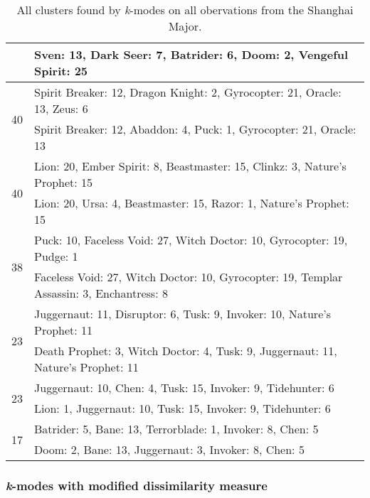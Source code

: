 \documentclass[result.tex]{subfiles}
\begin{document}
\begin{table}[H]
\begin{tabular}{ | c | p{12.5cm} | }
    & Sven: 13, Dark Seer: 7, Batrider: 6, Doom: 2, Vengeful Spirit: 25 \\
    \hline
    \multirow{2}{*}{40}
    & Spirit Breaker: 12, Dragon Knight: 2, Gyrocopter: 21, Oracle: 13, Zeus: 6 \\
    & Spirit Breaker: 12, Abaddon: 4, Puck: 1, Gyrocopter: 21, Oracle: 13 \\
    \hline
    \multirow{2}{*}{40}
    & Lion: 20, Ember Spirit: 8, Beastmaster: 15, Clinkz: 3, Nature's Prophet: 15 \\
    & Lion: 20, Ursa: 4, Beastmaster: 15, Razor: 1, Nature's Prophet: 15 \\
    \hline
    \multirow{2}{*}{38}
    & Puck: 10, Faceless Void: 27, Witch Doctor: 10, Gyrocopter: 19, Pudge: 1 \\
    & Faceless Void: 27, Witch Doctor: 10, Gyrocopter: 19, Templar Assassin: 3, Enchantress: 8 \\
    \hline
    \multirow{2}{*}{23}
    & Juggernaut: 11, Disruptor: 6, Tusk: 9, Invoker: 10, Nature's Prophet: 11 \\
    & Death Prophet: 3, Witch Doctor: 4, Tusk: 9, Juggernaut: 11, Nature's Prophet: 11 \\
    \hline
    \multirow{2}{*}{23}
    & Juggernaut: 10, Chen: 4, Tusk: 15, Invoker: 9, Tidehunter: 6 \\
    & Lion: 1, Juggernaut: 10, Tusk: 15, Invoker: 9, Tidehunter: 6 \\
    \hline
    \multirow{2}{*}{17}
    & Batrider: 5, Bane: 13, Terrorblade: 1, Invoker: 8, Chen: 5 \\
    & Doom: 2, Bane: 13, Juggernaut: 3, Invoker: 8, Chen: 5 \\
    \hline
  \end{tabular}
   \caption{All clusters found by \textit{k}-modes on all obervations from the Shanghai Major.}
   \label{tab:cl_app_shanghai_kmodes}
\end{table}

\newpage

\subsubsection*{\textit{k}-modes with modified dissimilarity measure}
\end{document}
